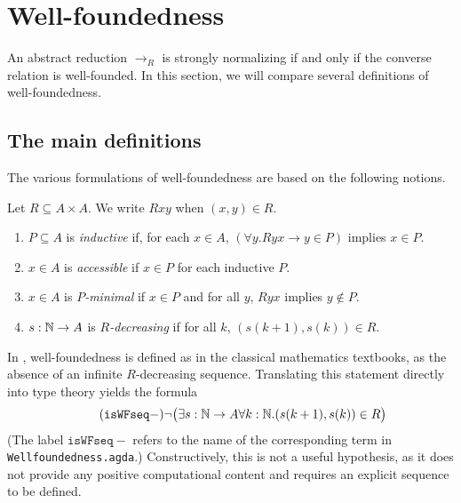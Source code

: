 \section{Well-foundedness}

\newcommand{\isWFacc}{\mathtt{isWFacc}}
\newcommand{\isWFseq}{\mathtt{isWFseq}}
\newcommand{\isWFmin}{\mathtt{isWFmin}}
\newcommand{\isWFaccm}{\mathtt{isWFacc-}}
\newcommand{\isWFseqm}{\mathtt{isWFseq-}}
\newcommand{\isWFminm}{\mathtt{isWFmin-}}

\newcommand{\isMinDec}{\mathtt{isMinDec}}

\newcommand{\then}{\Longrightarrow}
\label{sec:Well-foundedness}

An abstract reduction $\to_R$ is strongly normalizing
if and only if the converse relation is well-founded.
In this section, we will compare several definitions of well-foundedness.

\subsection{The main definitions}

The various formulations of well-foundedness are based on the following notions.
\begin{definition}
  Let $R \subseteq A \times A$.  We write $Rxy$ when $(x,y) \in R$.
  \begin{enumerate}
    \item $P \subseteq A$ is \emph{inductive}
    if, for each $x \in A$, $(\forall y. Ryx \to y \in P)$ implies $x \in P$.

    \item $x \in A$ is \emph{accessible} if $x \in P$ for each inductive $P$.

    \item $x \in A$ is \emph{$P$-minimal} if $x \in P$ and for all $y$,
    $Ryx$ implies $y \notin P$.

    \item $s : \mathbb{N} \to A$ is \emph{$R$-decreasing} if for all $k$, $(s(k+1),s(k)) \in R$.
  \end{enumerate}
\end{definition}

In \cite{Terese}, well-foundedness is defined as in the classical mathematics textbooks,
as the absence of an infinite $R$-decreasing sequence.
Translating this statement directly into type theory yields the formula
\[\tag{$\isWFseqm$} \lnot \big(\exists s : \nat \to A \forall k : \nat. (s(k+1),s(k)) \in R \big) \]
(The label $\isWFseqm$ refers to the name of the corresponding term in \texttt{Wellfoundedness.agda}.)
Constructively, this is not a useful hypothesis, as it does not provide any positive computational content and requires an explicit sequence to be defined.

